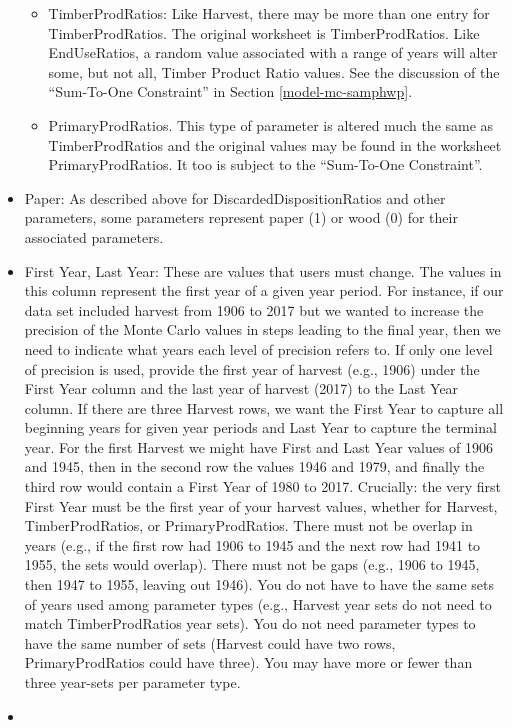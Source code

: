 \documentclass[
]{book}
\begin{document}
\begin{itemize}
\begin{itemize}
  \item
    TimberProdRatios: Like Harvest, there may be more than one entry for TimberProdRatios. The original worksheet is TimberProdRatios. Like EndUseRatios, a random value associated with a range of years will alter some, but not all, Timber Product Ratio values. See the discussion of the ``Sum-To-One Constraint'' in Section \ref{model-mc-samphwp}.
  \item
    PrimaryProdRatios. This type of parameter is altered much the same as TimberProdRatios and the original values may be found in the worksheet PrimaryProdRatios. It too is subject to the ``Sum-To-One Constraint''.
  \end{itemize}
\item
  Paper: As described above for DiscardedDispositionRatios and other parameters, some parameters represent paper (1) or wood (0) for their associated parameters.
\item
  First Year, Last Year: These are values that users must change. The values in this column represent the first year of a given year period. For instance, if our data set included harvest from 1906 to 2017 but we wanted to increase the precision of the Monte Carlo values in steps leading to the final year, then we need to indicate what years each level of precision refers to. If only one level of precision is used, provide the first year of harvest (e.g., 1906) under the First Year column and the last year of harvest (2017) to the Last Year column. If there are three Harvest rows, we want the First Year to capture all beginning years for given year periods and Last Year to capture the terminal year. For the first Harvest we might have First and Last Year values of 1906 and 1945, then in the second row the values 1946 and 1979, and finally the third row would contain a First Year of 1980 to 2017. Crucially: the very first First Year must be the first year of your harvest values, whether for Harvest, TimberProdRatios, or PrimaryProdRatios. There must not be overlap in years (e.g., if the first row had 1906 to 1945 and the next row had 1941 to 1955, the sets would overlap). There must not be gaps (e.g., 1906 to 1945, then 1947 to 1955, leaving out 1946). You do not have to have the same sets of years used among parameter types (e.g., Harvest year sets do not need to match TimberProdRatios year sets). You do not need parameter types to have the same number of sets (Harvest could have two rows, PrimaryProdRatios could have three). You may have more or fewer than three year-sets per parameter type.
\item

\end{itemize}
\end{document}
